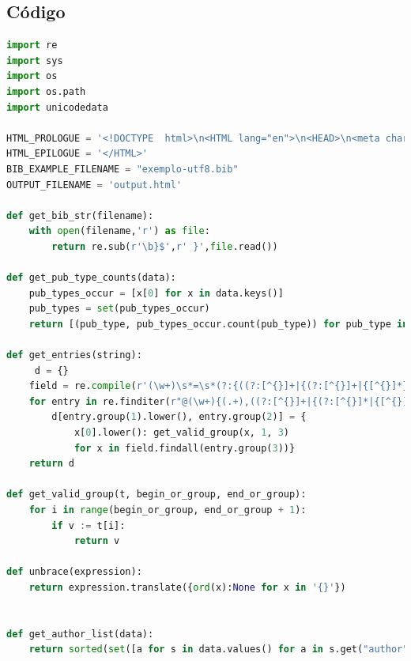 \documentclass[11pt,a4paper]{report}
\begin{document}
\begin{appendices}
\chapter{Código}


\begin{lstlisting}[language=python]
import re
import sys
import os
import os.path
import unicodedata

HTML_PROLOGUE = '<!DOCTYPE  html>\n<HTML lang="en">\n<HEAD>\n<meta charset="utf-8">\n      <TITLE>Categories in BibTeX</TITLE>\n <script type="text/x-mathjax-config"> MathJax.Hub.Config({"extensions":["tex2jax.js"],"jax":["input/TeX","output/HTML-CSS"],"messageStyle":"none","tex2jax":{"processEnvironments":false,"processEscapes":true,"inlineMath":[["$","$"]],"displayMath":[["$$","$$"],["\\[","\\]"]]},"TeX":{"extensions":["AMSmath.js","AMSsymbols.js","noErrors.js","noUndefined.js"]},"HTML-CSS":{"availableFonts":["TeX"]}}); </script> <script type="text/javascript" async src="file:////home/useralef/.vscode/extensions/shd101wyy.markdown-preview-enhanced-0.6.1/node_modules/@shd101wyy/mume/dependencies/mathjax/MathJax.js" charset="UTF-8"></script>  </HEAD>\n'
HTML_EPILOGUE = '</HTML>'
BIB_EXAMPLE_FILENAME = "exemplo-utf8.bib"
OUTPUT_FILENAME = 'output.html'

def get_bib_str(filename):
    with open(filename,'r') as file:
        return re.sub(r'\b}$',r' }',file.read())

def get_pub_type_counts(data):
    pub_types_occur = [x[0] for x in data.keys()]
    pub_types = set(pub_types_occur)
    return [(pub_type, pub_types_occur.count(pub_type)) for pub_type in pub_types]

def get_entries(string):
     d = {}
    field = re.compile(r'(\w+)\s*=\s*(?:{((?:[^{}]+|{(?:[^{}]+|{[^{}]*})+})+)}|"([^"]+)"|(\d+))')
    for entry in re.finditer(r"@(\w+){(.+),((?:[^{}]+|{(?:[^{}]*|{[^{}]*})+})+)", string):
        d[entry.group(1).lower(), entry.group(2)] = {
            x[0].lower(): get_valid_group(x, 1, 3)
            for x in field.findall(entry.group(3))}
    return d

def get_valid_group(t, begin_or_group, end_or_group):
    for i in range(begin_or_group, end_or_group + 1):
        if v := t[i]:
            return v

def unbrace(expression):
    return expression.translate({ord(x):None for x in '{}'})


def get_author_list(data):
    return sorted(set([a for s in data.values() for a in s.get("author", [])]))


\end{lstlisting}
\end{appendices}
\end{document}
